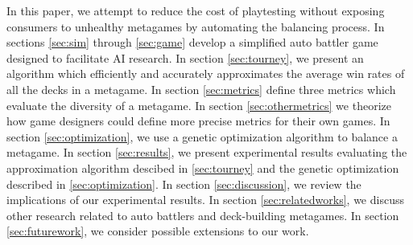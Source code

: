 In this paper, we attempt to reduce the cost of playtesting without
exposing consumers to unhealthy metagames by automating the balancing
process. In sections \ref{sec:sim} through \ref{sec:game} develop a
simplified auto battler game designed to facilitate AI research. In
section \ref{sec:tourney}, we present an algorithm which efficiently
and accurately approximates the average win rates of all the decks in
a metagame. In section \ref{sec:metrics} define three metrics which
evaluate the diversity of a metagame. In section
\ref{sec:othermetrics} we theorize how game designers could define
more precise metrics for their own games. In section
\ref{sec:optimization}, we use a genetic optimization algorithm to
balance a metagame. In section \ref{sec:results}, we present
experimental results evaluating the approximation algorithm descibed
in \ref{sec:tourney} and the genetic optimization described in
\ref{sec:optimization}. In section \ref{sec:discussion}, we review the
implications of our experimental results. In section
\ref{sec:relatedworks}, we discuss other research related to auto
battlers and deck-building metagames. In section \ref{sec:futurework},
we consider possible extensions to our work.







